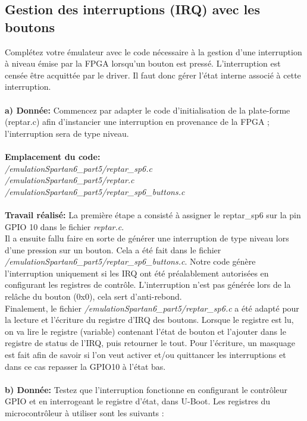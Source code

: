 \subsection{Gestion des interruptions (IRQ) avec les boutons}
Complétez votre émulateur avec le code nécessaire à la gestion d'une interruption à niveau émise par
la FPGA lorsqu'un bouton est pressé. L'interruption est censée être acquittée par le driver. Il faut donc
gérer l'état interne associé à cette interruption. \\\\
\textbf{a) Donnée: }Commencez par adapter le code d'initialisation de la plate-forme (reptar.c) afin d'instancier une
interruption en provenance de la FPGA ; l'interruption sera de type niveau.\\\\
\textbf{Emplacement du code:}\\\textit{/emulationSpartan6\_part5/reptar\_sp6.c}\\
\textit{/emulationSpartan6\_part5/reptar.c}\\
\textit{/emulationSpartan6\_part5/reptar\_sp6\_buttons.c}\\\\
\textbf{Travail réalisé: }La première étape a consisté à assigner le reptar\_sp6 sur la pin GPIO 10 dans le fichier \textit{reptar.c}.\\Il a ensuite fallu faire en sorte de générer une interruption de type niveau lors d'une pression sur un bouton. Cela a été fait dans le fichier \textit{/emulationSpartan6\_part5/reptar\_sp6\_buttons.c}. Notre code génère l'interruption uniquement si les IRQ ont été préalablement autorisées en configurant les registres de contrôle. L'interruption n'est pas générée lors de la relâche du bouton (0x0), cela sert d'anti-rebond.\\
Finalement, le fichier \textit{/emulationSpartan6\_part5/reptar\_sp6.c} a été adapté pour la lecture et l'écriture du registre d'IRQ des boutons. Lorsque le registre est lu, on va lire le registre (variable) contenant l'état de bouton et l'ajouter dans le registre de status de l'IRQ, puis retourner le tout. Pour l'écriture, un masquage est fait afin de savoir si l'on veut activer et/ou quittancer les interruptions et dans ce cas repasser la GPIO10 à l'état bas.\\\\
\textbf{b) Donnée: }Testez que l'interruption fonctionne en configurant le contrôleur GPIO et en interrogeant le registre
d'état, dans U-Boot. Les registres du microcontrôleur à utiliser sont les suivants :
